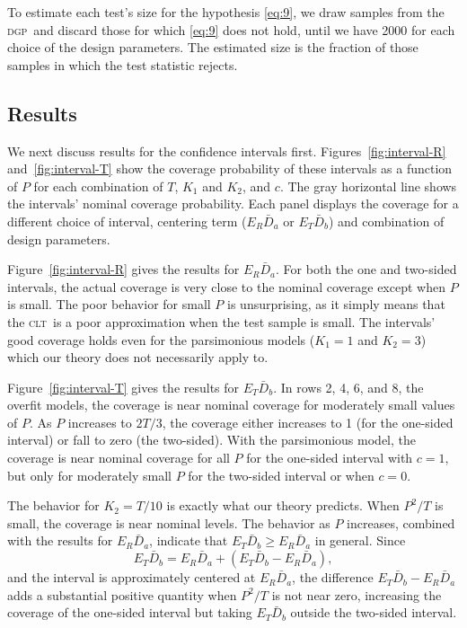 \documentclass[11pt]{article}
\newcommand{\oosA}{\bar{D}_a}
\newcommand{\oosB}{\bar{D}_b}
\newcommand{\clt}{\textsc{clt}}
\newcommand{\dgp}{\textsc{dgp}}
\begin{document}
To estimate each test's size for the hypothesis \eqref{eq:9}, we draw
samples from the \dgp\ and discard those for which \eqref{eq:9} does
not hold, until we have 2000 for each choice of the design parameters.
The estimated size is the fraction of those samples in which the test
statistic rejects.
\subsection{Results}
We next discuss results for the confidence intervals first.
Figures~\ref{fig:interval-R} and~\ref{fig:interval-T} show the
coverage probability of these intervals as a function of $P$ for each
combination of $T$, $K_1$ and $K_2$, and $c$.  The gray horizontal
line shows the intervals' nominal coverage probability.  Each panel
displays the coverage for a different choice of interval, centering
term ($E_R \oosA$ or $E_T \oosB$) and combination of design
parameters.

Figure~\ref{fig:interval-R} gives the results for $E_R \oosA$.  For
both the one and two-sided intervals, the actual coverage is very
close to the nominal coverage except when $P$ is small.  The poor
behavior for small $P$ is unsurprising, as it simply means that the
\clt\ is a poor approximation when the test sample is small.  The
intervals' good coverage holds even for the parsimonious models
($K_1=1$ and $K_2= 3$) which our theory does not necessarily apply to.

Figure~\ref{fig:interval-T} gives the results for $E_T \oosB$.  In
rows 2, 4, 6, and 8, the overfit models, the coverage is near nominal
coverage for moderately small values of $P$.  As $P$ increases to $2T/3$, the
coverage either increases to 1 (for the one-sided interval) or fall to
zero (the two-sided).  With the parsimonious model, the coverage is near
nominal coverage for all $P$ for the one-sided interval with $c=1$,
but only for moderately small $P$ for the two-sided interval or when
$c=0$.

The behavior for $K_2 = T/10$ is exactly what our theory predicts.
When $P^2/T$ is small, the coverage is near nominal levels.  The
behavior as $P$ increases, combined with the results for $E_R
\oosA$, indicate that $E_T \oosB \geq E_R \oosA$ in general.
Since
\[E_{T} \oosB = E_{R} \oosA + (E_{T} \oosB - E_{R} \oosA), \] and the
interval is approximately centered at $E_R \oosA$, the difference
$E_{T} \oosB - E_{R} \oosA$ adds a substantial positive quantity when
$P^2/T$ is not near zero, increasing the coverage of the one-sided
interval but taking $E_T \oosB$ outside the two-sided interval.
\end{document}
